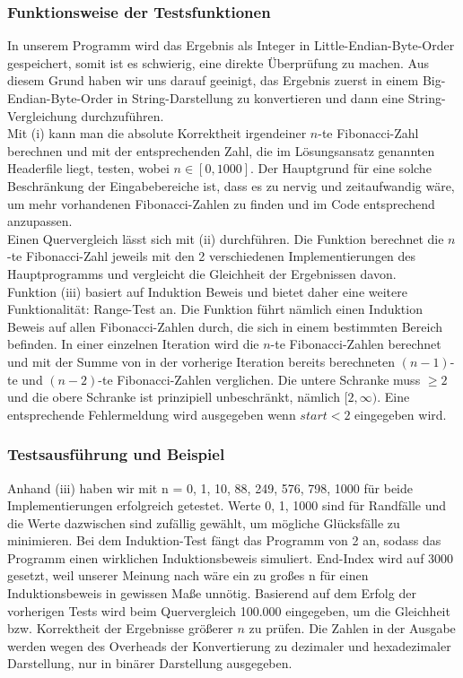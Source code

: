 \documentclass[course=erap]{aspdoc}
\begin{document}
\subsubsection{Funktionsweise der Testsfunktionen}
In unserem Programm wird das Ergebnis als Integer in Little-Endian-Byte-Order gespeichert, somit ist es schwierig, eine direkte Überprüfung zu machen. Aus diesem Grund haben wir uns darauf geeinigt, das Ergebnis zuerst in einem Big-Endian-Byte-Order in String-Darstellung zu konvertieren und dann eine String-Vergleichung durchzuführen.
\\Mit (i) kann man die \glqq absolute Korrektheit\grqq{} irgendeiner $n$-te Fibonacci-Zahl berechnen und mit der entsprechenden Zahl, die im Lösungsansatz genannten Headerfile liegt, testen, wobei $n \in [0, 1000]$. Der Hauptgrund für eine solche Beschränkung der Eingabebereiche ist, dass es zu nervig und zeitaufwandig wäre, um mehr vorhandenen Fibonacci-Zahlen zu finden und im Code entsprechend anzupassen.
\\Einen Quervergleich lässt sich mit (ii) durchführen. Die Funktion berechnet die $n$-te Fibonacci-Zahl jeweils mit den 2 verschiedenen Implementierungen des Hauptprogramms und vergleicht die Gleichheit der Ergebnissen davon.
\\Funktion (iii) basiert auf \glqq Induktion Beweis\grqq{} und bietet daher eine weitere Funktionalität: Range-Test an. Die Funktion führt nämlich einen Induktion Beweis auf allen Fibonacci-Zahlen durch, die sich in einem bestimmten Bereich befinden. In einer einzelnen Iteration wird die $n$-te Fibonacci-Zahlen berechnet und mit der Summe von in der vorherige Iteration bereits berechneten $(n-1)$-te und $(n-2)$-te Fibonacci-Zahlen verglichen. Die untere Schranke muss $\geq2$ und die obere Schranke ist prinzipiell unbeschränkt, nämlich $[2, \infty)$. Eine entsprechende Fehlermeldung wird ausgegeben wenn $start<2$ eingegeben wird. 

 \subsubsection{Testsausführung und Beispiel}
Anhand (iii) haben wir mit  n = 0, 1, 10, 88, 249, 576, 798, 1000 für beide Implementierungen erfolgreich getestet. Werte 0, 1, 1000 sind für Randfälle und die Werte dazwischen sind zufällig gewählt, um mögliche Glücksfälle zu minimieren. Bei dem Induktion-Test fängt das Programm von 2 an, sodass das Programm einen wirklichen Induktionsbeweis simuliert. End-Index wird auf 3000 gesetzt, weil unserer Meinung nach wäre ein zu großes n für einen Induktionsbeweis in gewissen Maße unnötig. Basierend auf dem Erfolg der vorherigen Tests wird beim Quervergleich 100.000 eingegeben, um die Gleichheit bzw. Korrektheit der Ergebnisse größerer $n$ zu prüfen. Die Zahlen in der Ausgabe werden wegen des Overheads der Konvertierung zu dezimaler und hexadezimaler Darstellung, nur in binärer Darstellung ausgegeben.
\end{document}
